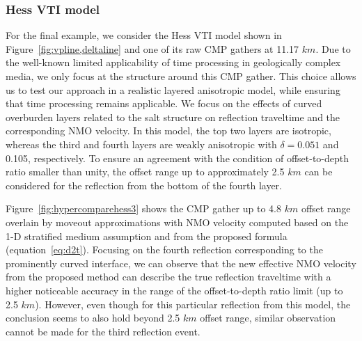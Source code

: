 \begin{table}
\caption{Model parameters for the layered isotropic model. The reference velocity at 3 $km$ and horizontal velocity gradient.}
\label{tbl:modeliso}
    \centering
\end{table}

\subsubsection{Hess VTI model}

For the final example, we consider the Hess VTI model shown in Figure~\ref{fig:vpline,deltaline} and one of its raw CMP gathers at 11.17 $km$. Due to the well-known limited applicability of time processing in geologically complex media, we only focus at the structure around this CMP gather. This choice allows us to test our approach in a realistic layered anisotropic model, while ensuring that time processing remains applicable. We focus on the effects of curved overburden layers related to the salt structure on reflection traveltime and the corresponding NMO velocity. In this model, the top two layers are isotropic, whereas the third and fourth layers are weakly anisotropic with $\delta=0.051$ and 0.105, respectively. To ensure an agreement with the condition of offset-to-depth ratio smaller than unity, the offset range up to approximately 2.5 $km$ can be considered for the reflection from the bottom of the fourth layer.


Figure~\ref{fig:hypercomparehess3} shows the CMP gather up to 4.8 $km$ offset range overlain by moveout approximations with NMO velocity computed based on the 1-D stratified medium assumption and from the proposed formula (equation~\ref{eq:d2t}). Focusing on the fourth reflection corresponding to the prominently curved interface, we can observe that the new effective NMO velocity from the proposed method can describe the true reflection traveltime with a higher noticeable accuracy in the range of the offset-to-depth ratio limit (up to 2.5 $km$). However, even though for this particular reflection from this model, the conclusion seems to also hold beyond 2.5 $km$ offset range, similar observation cannot be made for the third reflection event.


